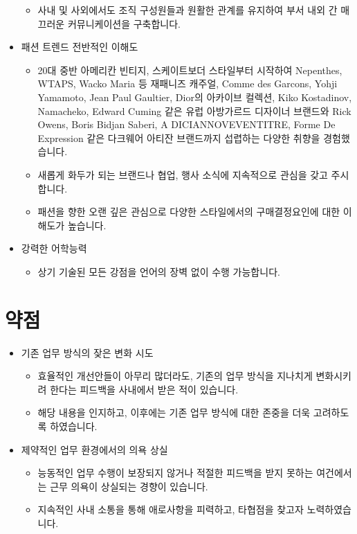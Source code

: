 \documentclass[a4paper,10pt]{extarticle}
\begin{document}
\begin{itemize}
	      \begin{itemize}
		      \item 사내 및 사외에서도 조직 구성원들과 원활한 관계를 유지하여 부서 내외 간 매끄러운 커뮤니케이션을 구축합니다.
	      \end{itemize}
	\item 패션 트렌드 전반적인 이해도
	      \begin{itemize}
		      \item 20대 중반 아메리칸 빈티지, 스케이트보더 스타일부터 시작하여 Nepenthes, WTAPS, Wacko Maria 등 재패니즈 캐주얼, Comme des Garcons, Yohji Yamamoto, Jean Paul Gaultier, Dior의 아카이브 컬렉션, Kiko Kostadinov, Namacheko, Edward Cuming 같은 유럽 아방가르드 디자이너 브랜드와 Rick Owens, Boris Bidjan Saberi, A DICIANNOVEVENTITRE, Forme De Expression 같은 다크웨어 아티잔 브랜드까지 섭렵하는 다양한 취향을 경험했습니다.
		      \item 새롭게 화두가 되는 브랜드나 협업, 행사 소식에 지속적으로 관심을 갖고 주시합니다.
		      \item 패션을 향한 오랜 깊은 관심으로 다양한 스타일에서의 구매결정요인에 대한 이해도가 높습니다.
	      \end{itemize}
	\item 강력한 어학능력
	      \begin{itemize}
		      \item 상기 기술된 모든 강점을 언어의 장벽 없이 수행 가능합니다.
	      \end{itemize}
\end{itemize}

\section*{약점}
\begin{itemize}
	\item 기존 업무 방식의 잦은 변화 시도
	      \begin{itemize}
		      \item 효율적인 개선안들이 아무리 많더라도, 기존의 업무 방식을 지나치게 변화시키려 한다는 피드백을 사내에서 받은 적이 있습니다.
		      \item 해당 내용을 인지하고, 이후에는 기존 업무 방식에 대한 존중을 더욱 고려하도록 하였습니다.
	      \end{itemize}
\end{itemize}
\begin{itemize}
	\item 제약적인 업무 환경에서의 의욕 상실
	      \begin{itemize}
		      \item 능동적인 업무 수행이 보장되지 않거나 적절한 피드백을 받지 못하는 여건에서는 근무 의욕이 상실되는 경향이 있습니다.
		      \item 지속적인 사내 소통을 통해 애로사항을 피력하고, 타협점을 찾고자 노력하였습니다.
	      \end{itemize}
\end{itemize}
\end{document}
